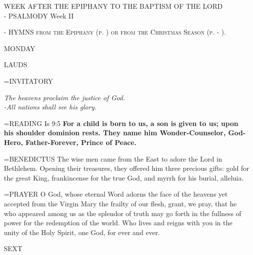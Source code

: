 \begin{center}\normalsize WEEK AFTER THE EPIPHANY TO THE BAPTISM OF THE LORD\\
\footnotesize - PSALMODY Week II\\
\begin{center}\noindent\textsc{\small{- HYMNS from the Epiphany (p. \pageref{epiphany:hymn}) or from the Christmas Season (p. \pageref{christmas:firstHymn} - \pageref{christmas:lastHymn}).\\}}\end{center}
\end{center}

\begin{center}
\normalsize MONDAY
\end{center}

\begin{flushleft}\normalsize LAUDS\\\end{flushleft}

\hangindent=\parindent \small{INVITATORY}
\begin{center}
\textit{The heavens proclaim the justice of God.\\}
\textit{-All nations shall see his glory.\\}
\end{center}

\hangindent=\parindent \small{READING}    Is 9:5 \textbf{    For a child is born to us, a son is given to us; upon his shoulder dominion rests. They name him Wonder-Counselor, God-Hero, Father-Forever, Prince of Peace.\\}

\hangindent=\parindent \small{BENEDICTUS 	The wise men came from the East to adore the Lord in Bethlehem. Opening their treasures, they offered him three precious gifts: gold for the great King, frankincense for the true God, and myrrh for his burial, alleluia.\\}

\hangindent=\parindent \small{PRAYER 	O God, whose eternal Word adorns the face of the heavens yet accepted from the Virgin Mary the frailty of our flesh, grant, we pray, that he who appeared among us as the splendor of truth may go forth in the fullness of power for the redemption of the world. Who lives and reigns with you in the unity of the Holy Spirit, one God, for ever and ever.}

\begin{flushleft}\normalsize SEXT\\\end{flushleft}

